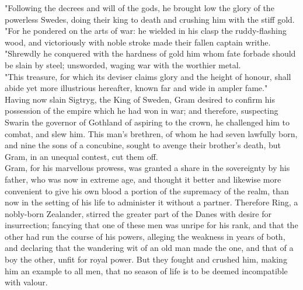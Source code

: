 \documentclass[10pt,a4paper]{report}
\begin{document}
"Following the decrees and will of the gods, he brought low the glory of the powerless Swedes, doing their king to death and crushing him with the stiff gold.\\

"For he pondered on the arts of war: he wielded in his clasp the ruddy-flashing wood, and victoriously with noble stroke made their fallen captain writhe.\\

"Shrewdly he conquered with the hardness of gold him whom fate forbade should be slain by steel; unsworded, waging war with the worthier metal.\\

"This treasure, for which its deviser claims glory and the height of honour, shall abide yet more illustrious hereafter, known far and wide in ampler fame."\\

Having now slain Sigtryg, the King of Sweden, Gram desired to confirm his possession of the empire which he had won in war; and therefore, suspecting Swarin the governor of Gothland of aspiring to the crown, he challenged him to combat, and slew him. This man's brethren, of whom he had seven lawfully born, and nine the sons of a concubine, sought to avenge their brother's death, but Gram, in an unequal contest, cut them off.\\

Gram, for his marvellous prowess, was granted a share in the sovereignty by his father, who was now in extreme age, and thought it better and likewise more convenient to give his own blood a portion of the supremacy of the realm, than now in the setting of his life to administer it without a partner. Therefore Ring, a nobly-born Zealander, stirred the greater part of the Danes with desire for insurrection; fancying that one of these men was unripe for his rank, and that the other had run the course of his powers, alleging the weakness in years of both, and declaring that the wandering wit of an old man made the one, and that of a boy the other, unfit for royal power. But they fought and crushed him, making him an example to all men, that no season of life is to be deemed incompatible with valour.\\
\end{document}
